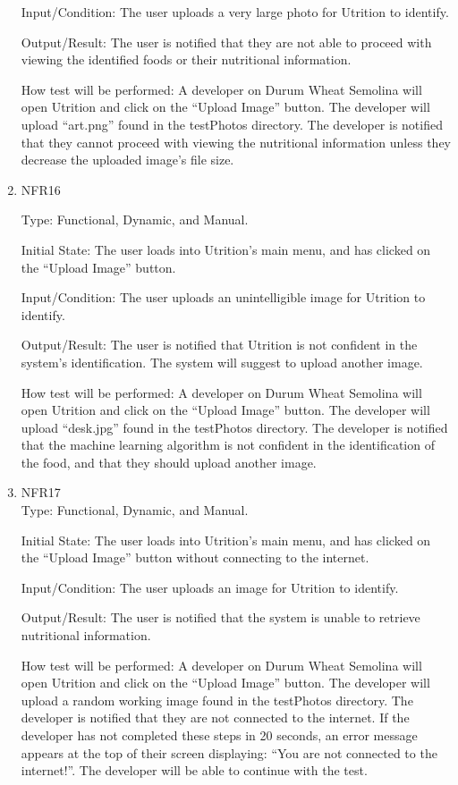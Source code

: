 \documentclass[12pt, titlepage]{article}
\begin{document}
\begin{enumerate}
		Input/Condition: The user uploads a very large photo for Utrition to identify.
		
		Output/Result: The user is notified that they are not able to proceed with viewing the identified foods or their nutritional information.
		
		How test will be performed: A developer on Durum Wheat Semolina will open Utrition and click on the “Upload Image” button. The developer will upload “art.png” found in the testPhotos directory. The developer is notified that they cannot proceed with viewing the nutritional information unless they decrease the uploaded image’s file size.
		
		\item{NFR16\\} 
		
		Type: Functional, Dynamic, and Manual.
		
		Initial State: The user loads into Utrition’s main menu, and has clicked on the “Upload Image” button.
		
		Input/Condition: The user uploads an unintelligible image for Utrition to identify.
		
		Output/Result: The user is notified that Utrition is not confident in the system’s identification. The system will suggest to upload another image.
		
		How test will be performed: A developer on Durum Wheat Semolina will open Utrition and click on the “Upload Image” button. The developer will upload “desk.jpg” found in the testPhotos directory. The developer is notified that the machine learning algorithm is not confident in the identification of the food, and that they should upload another image.
		
		\item{NFR17\\}
		Type: Functional, Dynamic, and Manual.
		
		Initial State: The user loads into Utrition’s main menu, and has clicked on the “Upload Image” button without connecting to the internet.
		
		Input/Condition: The user uploads an image for Utrition to identify.
		
		Output/Result: The user is notified that the system is unable to retrieve nutritional information.
		
		How test will be performed: A developer on Durum Wheat Semolina will open Utrition and click on the “Upload Image” button. The developer will upload a random working image found in the testPhotos directory. The developer is notified that they are not connected to the internet. If the developer has not completed these steps in 20 seconds, an error message appears at the top of their screen displaying: “You are not connected to the internet!”. The developer will be able to continue with the test.
		

\end{enumerate}
\end{document}
